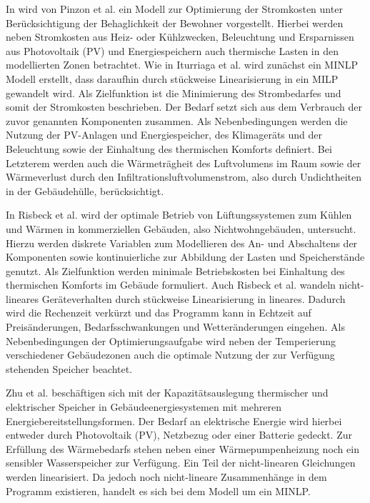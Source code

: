 In \cite{Pinzon.23.04.201726.04.2017} wird von Pinzon et al. ein Modell zur Optimierung der Stromkosten unter Berücksichtigung der Behaglichkeit der Bewohner vorgestellt.
Hierbei werden neben Stromkosten aus Heiz- oder Kühlzwecken, Beleuchtung und Ersparnissen aus Photovoltaik (PV) und Energiespeichern auch thermische Lasten in den modellierten Zonen betrachtet.
Wie in Iturriaga et al. \cite{Iturriaga.2017} wird zunächst ein MINLP Modell erstellt, dass daraufhin durch stückweise Linearisierung in ein MILP gewandelt wird.
Als Zielfunktion ist die Minimierung des Strombedarfes und somit der Stromkosten beschrieben.
Der Bedarf setzt sich aus dem Verbrauch der zuvor genannten Komponenten zusammen.
Als Nebenbedingungen werden die Nutzung der PV-Anlagen und Energiespeicher, des Klimageräts und der Beleuchtung sowie der Einhaltung des thermischen Komforts definiert.
Bei Letzterem werden auch die Wärmeträgheit des Luftvolumens im Raum sowie der Wärmeverlust durch den Infiltrationsluftvolumenstrom, also durch Undichtheiten in der Gebäudehülle, berücksichtigt.


In Risbeck et al. \cite{Risbeck.2017} wird der optimale Betrieb von Lüftungssystemen zum Kühlen und Wärmen in kommerziellen Gebäuden, also Nichtwohngebäuden, untersucht.
Hierzu werden diskrete Variablen zum Modellieren des An- und Abschaltens der Komponenten sowie kontinuierliche zur Abbildung der Lasten und Speicherstände genutzt.
Als Zielfunktion werden minimale Betriebskosten bei Einhaltung des thermischen Komforts im Gebäude formuliert.
Auch Risbeck et al. wandeln nicht-lineares Geräteverhalten durch stückweise Linearisierung in lineares.
Dadurch wird die Rechenzeit verkürzt und das Programm kann in Echtzeit auf Preisänderungen, Bedarfsschwankungen und Wetteränderungen eingehen.
Als Nebenbedingungen der Optimierungsaufgabe wird neben der Temperierung verschiedener Gebäudezonen auch die optimale Nutzung der zur Verfügung stehenden Speicher beachtet.

Zhu et al. \cite{Zhu.2019} beschäftigen sich mit der Kapazitätsauslegung thermischer und elektrischer Speicher in Gebäudeenergiesystemen mit mehreren Energiebereitstellungsformen. 
Der Bedarf an elektrische Energie wird hierbei entweder durch Photovoltaik (PV), Netzbezug oder einer Batterie gedeckt. 
Zur Erfüllung des Wärmebedarfs stehen neben einer Wärmepumpenheizung noch ein sensibler Wasserspeicher zur Verfügung.
Ein Teil der nicht-linearen Gleichungen werden linearisiert. Da jedoch noch nicht-lineare Zusammenhänge in dem Programm existieren, handelt es sich bei dem Modell um ein MINLP.


